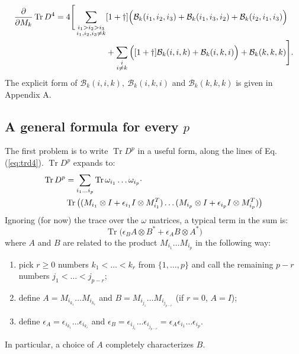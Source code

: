 \documentclass[12pt,a4paper]{article}
\DeclareMathOperator{\Tr}{Tr}
\begin{document}
\begin{align} 
\frac{\partial}{\partial M_k} \Tr D^4 = 4 \Bigg[ \sum_{\substack{i_1 > i_2 > i_3 \\ i_1,i_2,i_3 \neq k}} &[1+\dagger] \Big( \mathcal{B}_k(i_1, i_2, i_3) + \mathcal{B}_k(i_1, i_3, i_2) + \mathcal{B}_k(i_2, i_1, i_3) \Big) \notag \\
&+ \sum_{\substack{i \\ i \neq k}} \Big( [1+\dagger] \mathcal{B}_k(i, i, k) + \mathcal{B}_k(i, k, i) \Big) + \mathcal{B}_k(k,k,k) \Bigg].
\end{align}
The explicit form of $\mathcal{B}_k(i,i,k), \ \mathcal{B}_k(i,k,i)$ and $\mathcal{B}_k(k,k,k)$ is given in Appendix A.
\subsection{A general formula for every $p$}
The first problem is to write $\Tr D^p$ in a useful form, along the lines of Eq.(\ref{eq:trd4}).\newline
$\Tr D^p$ expands to:
\begin{align}
\Tr D^p &= \sum_{i_1 \ldots i_p} \Tr \omega_{i_1} \ldots \omega_{i_p} \cdot \notag \\
&\Tr \big( (M_{i_1} \otimes I + \epsilon_{i_1} I \otimes M_{i_1}^T) \ldots  (M_{i_p} \otimes I + \epsilon_{i_p} I \otimes M_{i_p}^T) \big)
\end{align}
Ignoring (for now) the trace over the $\omega$ matrices, a typical term in the sum is:
\begin{equation}\label{eq:typical}
\Tr \big( \epsilon_B A \otimes B^* + \epsilon_A B \otimes A^* \big)
\end{equation}
where $A$ and $B$ are related to the product $M_{i_1} \ldots M_{i_p}$ in the following way:
\begin{enumerate}
\item pick $r \geq 0$ numbers $k_1 < \ldots < k_r$ from $\{1, \ldots , p\}$ and call the remaining $p-r$ numbers $j_1 < \ldots < j_{p-r}$;
\item define $A = M_{i_{k_1}} \ldots M_{i_{k_r}}$ and $B = M_{i_{j_1}} \ldots M_{i_{j_{p-r}}}$ (if $r=0$, $A=I$);
\item define $\epsilon_A = \epsilon_{i_{k_1}} \ldots \epsilon_{i_{k_r}}$ and $\epsilon_B = \epsilon_{i_{j_1}} \ldots \epsilon_{i_{j_{p-r}}} = \epsilon_A \epsilon_{i_1} \ldots \epsilon_{i_p}$.
\end{enumerate}
In particular, a choice of $A$ completely characterizes $B$. \newline
\end{document}
